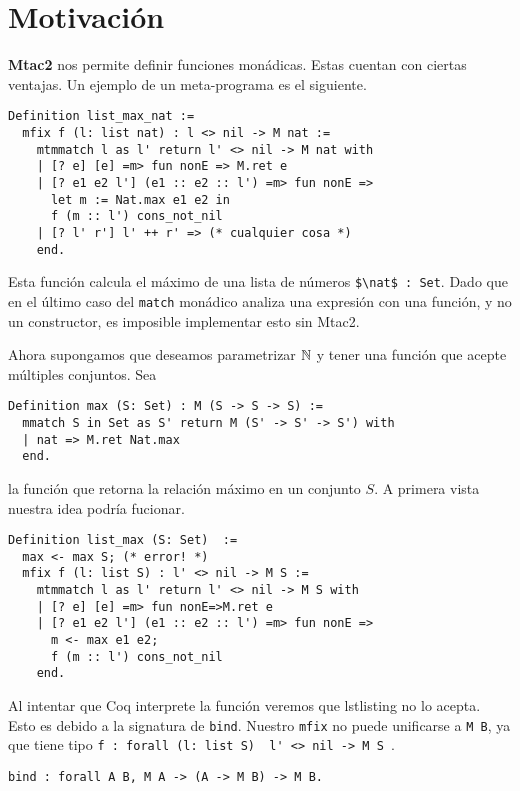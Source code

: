 \section{Motivación}

\textbf{Mtac2} nos permite definir funciones monádicas. Estas cuentan con
ciertas ventajas. Un ejemplo de un meta-programa es el siguiente.

\begin{lstlisting}
Definition list_max_nat :=
  mfix f (l: list nat) : l <> nil -> M nat :=
    mtmmatch l as l' return l' <> nil -> M nat with
    | [? e] [e] =m> fun nonE => M.ret e
    | [? e1 e2 l'] (e1 :: e2 :: l') =m> fun nonE =>
      let m := Nat.max e1 e2 in
      f (m :: l') cons_not_nil
    | [? l' r'] l' ++ r' => (* cualquier cosa *) 
    end.
\end{lstlisting}

Esta función calcula el máximo de una lista de números \lstinline{$\nat$ : Set}.
Dado que en el último caso del \lstinline{match} monádico analiza una expresión
con una función, y no un constructor, es imposible implementar esto sin Mtac2.

Ahora supongamos que deseamos parametrizar $\mathbb{N}$ y tener una función que acepte
múltiples conjuntos. Sea
\begin{lstlisting}
Definition max (S: Set) : M (S -> S -> S) :=
  mmatch S in Set as S' return M (S' -> S' -> S') with
  | nat => M.ret Nat.max
  end.
\end{lstlisting}

la función que retorna la relación máximo en un conjunto $S$.
A primera vista nuestra idea podría fucionar.

\begin{lstlisting}
Definition list_max (S: Set)  :=
  max <- max S; (* error! *)
  mfix f (l: list S) : l' <> nil -> M S :=
    mtmmatch l as l' return l' <> nil -> M S with
    | [? e] [e] =m> fun nonE=>M.ret e
    | [? e1 e2 l'] (e1 :: e2 :: l') =m> fun nonE =>
      m <- max e1 e2;
      f (m :: l') cons_not_nil
    end.
\end{lstlisting}

Al intentar que Coq interprete la función veremos que lstlisting no lo acepta.
Esto es debido a la signatura de \lstinline{bind}.
Nuestro \lstinline{mfix} no puede unificarse a \lstinline{M B}, ya que tiene
tipo \lstinline{f : forall (l: list S)  l' <> nil -> M S }.

\begin{lstlisting}
bind : forall A B, M A -> (A -> M B) -> M B.
\end{lstlisting}

